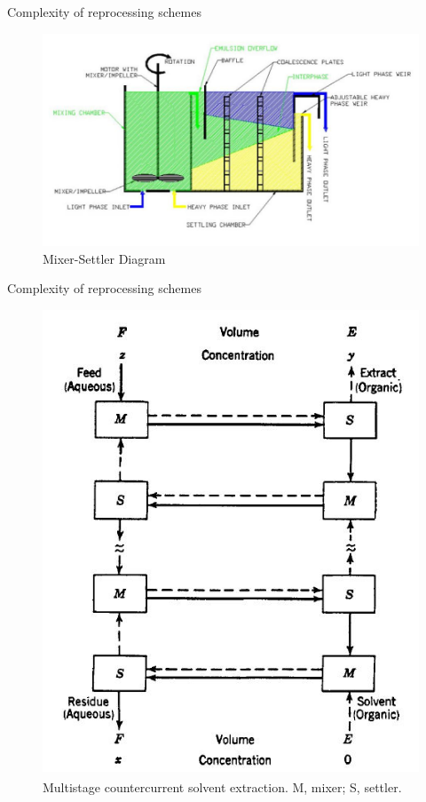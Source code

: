 \documentclass{beamer}
\newcommand{\tss}{\textsuperscript}
\begin{document}
\begin{frame}{Complexity of reprocessing schemes}
  \begin{figure}[H]
    \vspace*{-1cm}
    \begin{center}
      \includegraphics[scale = 0.4]{mixer}
      \caption{\tiny{Mixer-Settler Diagram}}
    \end{center}
  \end{figure}
\end{frame}


\begin{frame}{Complexity of reprocessing schemes}
  \begin{figure}[H]
    \vspace*{-1cm}
    \begin{center}
      \includegraphics[scale = 0.35]{stage}
      \caption{\tiny{Multistage countercurrent solvent extraction.
          M, mixer; S, settler.\tss{\cite{benedict1982nuclear}}}}
    \end{center}
  \end{figure}
\end{frame}
\end{document}
